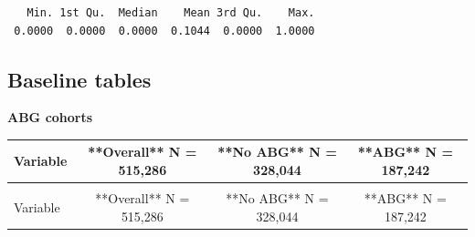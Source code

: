 \documentclass[
  11pt,
  letterpaper,
  DIV=11,
  numbers=noendperiod]{scrartcl}
\begin{document}
\begin{verbatim}
   Min. 1st Qu.  Median    Mean 3rd Qu.    Max. 
 0.0000  0.0000  0.0000  0.1044  0.0000  1.0000 
\end{verbatim}

\subsection{Baseline tables}\label{baseline-tables}

\begin{center}\textbf{ABG cohorts}\end{center}

\begingroup\fontsize{7}{9}\selectfont

\begin{longtable*}{>{\raggedright\arraybackslash}p{2.0in}ccc}
\toprule
Variable & **Overall**  N = 515,286 & **No ABG**  N = 328,044 & **ABG**  N = 187,242\\
\midrule
\endfirsthead
{}\\
\toprule
Variable & **Overall**  N = 515,286 & **No ABG**  N = 328,044 & **ABG**  N = 187,242\\
\midrule
\endhead


\end{longtable*}
\end{document}
